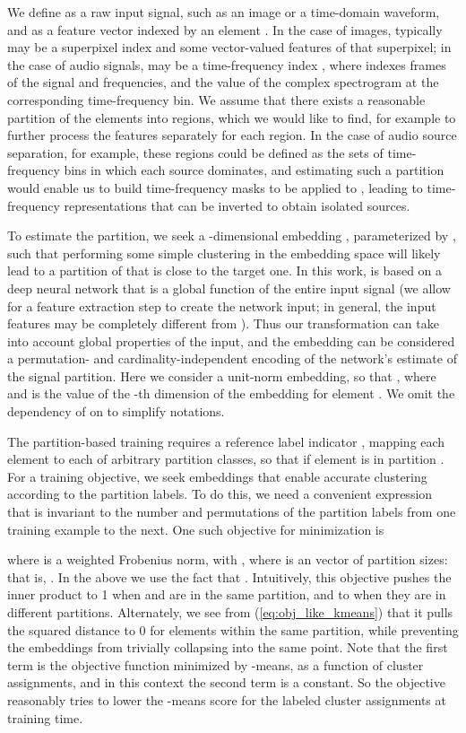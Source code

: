 \documentclass[9pt]{article} \usepackage{nips15submit_e,times}
\begin{document}
We define as  a raw input signal, such as an image or a time-domain waveform, and as  a feature vector indexed by an element . In the case of images,  typically may be a superpixel index and  some vector-valued features of that superpixel; in the case of audio signals,  may be a time-frequency index , where  indexes frames of the signal and  frequencies, and  the value of the complex spectrogram at the corresponding time-frequency bin.
We assume that there exists a reasonable partition of the elements  into regions, which we would like to find, for example to further process the features  separately for each region. In the case of audio source separation, for example, these regions could be defined as the sets of time-frequency bins in which each source dominates, and estimating such a partition would enable us to build time-frequency masks to be applied to , leading to time-frequency representations that can be inverted to obtain isolated sources.

To estimate the partition, we seek a -dimensional embedding , parameterized by , such that performing some simple clustering in the embedding space will likely lead to a partition of  that is close to the target one. 
In this work,  is based on a deep neural network that is a global function of the entire input signal  (we allow for a feature extraction step to create the network input; in general, the input features may be completely different from ).   Thus our transformation can take into account global properties of the input, and the embedding can be considered a permutation- and cardinality-independent encoding of the network's estimate of the signal partition. 
Here we consider a unit-norm embedding, so that , where  and  is the value of the -th dimension of the embedding for element . We omit the dependency of  on  to simplify notations.

The partition-based training requires a reference label indicator ,  mapping each element  to each of  arbitrary partition classes, so that  if element  is in partition .   
For a training objective, we seek embeddings that enable accurate clustering according to the partition labels.
To do this, we need a convenient expression that is invariant to the number and permutations of the partition labels from one training example to the next. 
One such objective for minimization is 

where  is a weighted Frobenius norm, with , where  is an  vector of partition sizes: that is, .   In the above we use the fact that .  
Intuitively, this objective pushes the inner product  to 1 when  and  are in the same partition, and to  when they are in different partitions. Alternately, we see from (\ref{eq:obj_like_kmeans}) that it pulls the squared distance  to 0 for elements within the same partition, while preventing the embeddings from trivially collapsing into the same point.  Note that the first term is the objective function minimized by -means, as a function of cluster assignments, and in this context the second term is a constant.  So the objective reasonably tries to lower the -means score for the labeled cluster assignments at training time.       
\end{document}
